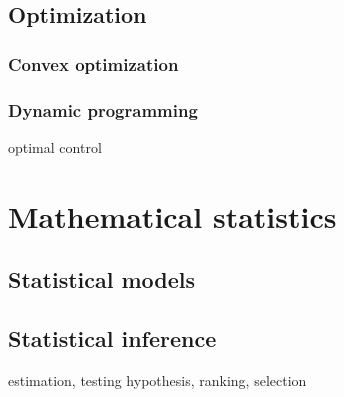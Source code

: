 \documentclass{../note}
\begin{document}
\chapter{Optimization}
\section{Convex optimization}
\section{Dynamic programming}
optimal control




\part{Mathematical statistics}
\chapter{Statistical models}
\chapter{Statistical inference}
estimation, testing hypothesis, ranking, selection
\chapter{}
\end{document}
